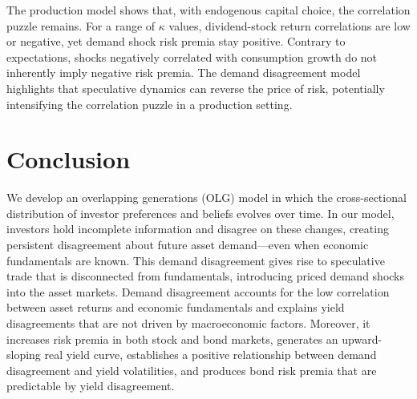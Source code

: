 \documentclass[preprint,11pt,authoryear]{elsarticle}
\renewcommand{\baselinestretch}{2}
\theoremstyle{plain}
\begin{document}
The production model shows that, with endogenous capital choice, the correlation puzzle remains. For a range of \( \kappa \) values, dividend-stock return correlations are low or negative, yet demand shock risk premia stay positive. Contrary to expectations, shocks negatively correlated with consumption growth do not inherently imply negative risk premia. The demand disagreement model highlights that speculative dynamics can reverse the price of risk, potentially intensifying the correlation puzzle in a production setting.





\section{Conclusion}\label{sec:conclusion}

We develop an overlapping generations (OLG) model in which the cross-sectional distribution of investor preferences and beliefs evolves over time. In our model, investors hold incomplete information and disagree on these changes, creating persistent disagreement about future asset demand—even when economic fundamentals are known. This demand disagreement gives rise to speculative trade that is disconnected from fundamentals, introducing priced demand shocks into the asset markets.  Demand disagreement accounts for the low correlation between asset returns and economic fundamentals and explains yield disagreements that are not driven by macroeconomic factors. Moreover, it increases risk premia in both stock and bond markets, generates an upward-sloping real yield curve, establishes a positive relationship between demand disagreement and yield volatilities, and produces bond risk premia that are predictable by yield disagreement. 








 
 \begingroup
	
	\label{references}
\endgroup   

\renewcommand{\baselinestretch}{1}  %
    

\appendix

 
\end{document}
